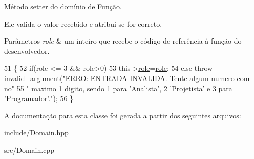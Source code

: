 Método setter do domínio de Função. 

Ele valida o valor recebido e atribui se for correto. 
\begin{DoxyParams}{Parâmetros}
{\em role} & um inteiro que recebe o código de referência à função do desenvolvedor. \\
\hline
\end{DoxyParams}

\begin{DoxyCode}
51 \{
52     \textcolor{keywordflow}{if}(role <= 3 && role>0)
53         this->\hyperlink{classRole_a19a26703a0776f3ee79ce0e057b908cb}{role}=\hyperlink{classRole_a19a26703a0776f3ee79ce0e057b908cb}{role};
54     \textcolor{keywordflow}{else} \textcolor{keywordflow}{throw} invalid\_argument(\textcolor{stringliteral}{"ERRO: ENTRADA INVALIDA. Tente algum numero com no"}
55         \textcolor{stringliteral}{" maximo 1 digito, sendo 1 para 'Analista', 2 'Projetista' e 3 para 'Programador'."});
56 \}
\end{DoxyCode}


A documentação para esta classe foi gerada a partir dos seguintes arquivos\+:\begin{DoxyCompactItemize}
\item 
include/Domain.\+hpp\item 
src/Domain.\+cpp\end{DoxyCompactItemize}
